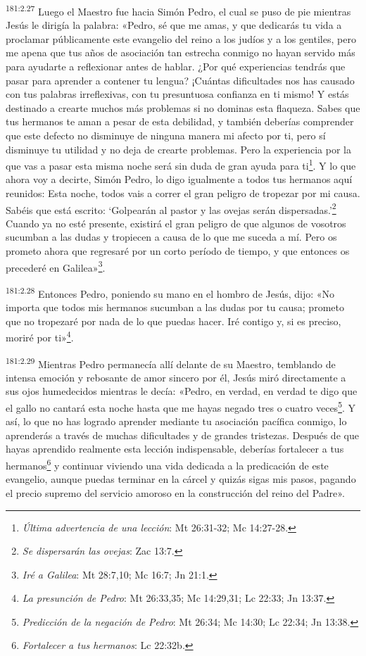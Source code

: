 \par 
\textsuperscript{181:2.27} Luego el Maestro fue hacia Simón Pedro, el cual se puso de pie mientras Jesús le dirigía la palabra: «Pedro, sé que me amas, y que dedicarás tu vida a proclamar públicamente este evangelio del reino a los judíos y a los gentiles, pero me apena que tus años de asociación tan estrecha conmigo no hayan servido más para ayudarte a reflexionar antes de hablar. ¿Por qué experiencias tendrás que pasar para aprender a contener tu lengua? ¡Cuántas dificultades nos has causado con tus palabras irreflexivas, con tu presuntuosa confianza en ti mismo! Y estás destinado a crearte muchos más problemas si no dominas esta flaqueza. Sabes que tus hermanos te aman a pesar de esta debilidad, y también deberías comprender que este defecto no disminuye de ninguna manera mi afecto por ti, pero sí disminuye tu utilidad y no deja de crearte problemas. Pero la experiencia por la que vas a pasar esta misma noche será sin duda de gran ayuda para ti\footnote{\textit{Última advertencia de una lección}: Mt 26:31-32; Mc 14:27-28.}. Y lo que ahora voy a decirte, Simón Pedro, lo digo igualmente a todos tus hermanos aquí reunidos: Esta noche, todos vais a correr el gran peligro de tropezar por mi causa. Sabéis que está escrito: `Golpearán al pastor y las ovejas serán dispersadas.'\footnote{\textit{Se dispersarán las ovejas}: Zac 13:7.} Cuando ya no esté presente, existirá el gran peligro de que algunos de vosotros sucumban a las dudas y tropiecen a causa de lo que me suceda a mí. Pero os prometo ahora que regresaré por un corto período de tiempo, y que entonces os precederé en Galilea»\footnote{\textit{Iré a Galilea}: Mt 28:7,10; Mc 16:7; Jn 21:1.}.

\par 
\textsuperscript{181:2.28} Entonces Pedro, poniendo su mano en el hombro de Jesús, dijo: «No importa que todos mis hermanos sucumban a las dudas por tu causa; prometo que no tropezaré por nada de lo que puedas hacer. Iré contigo y, si es preciso, moriré por ti»\footnote{\textit{La presunción de Pedro}: Mt 26:33,35; Mc 14:29,31; Lc 22:33; Jn 13:37.}.

\par 
\textsuperscript{181:2.29} Mientras Pedro permanecía allí delante de su Maestro, temblando de intensa emoción y rebosante de amor sincero por él, Jesús miró directamente a sus ojos humedecidos mientras le decía: «Pedro, en verdad, en verdad te digo que el gallo no cantará esta noche hasta que me hayas negado tres o cuatro veces\footnote{\textit{Predicción de la negación de Pedro}: Mt 26:34; Mc 14:30; Lc 22:34; Jn 13:38.}. Y así, lo que no has logrado aprender mediante tu asociación pacífica conmigo, lo aprenderás a través de muchas dificultades y de grandes tristezas. Después de que hayas aprendido realmente esta lección indispensable, deberías fortalecer a tus hermanos\footnote{\textit{Fortalecer a tus hermanos}: Lc 22:32b.} y continuar viviendo una vida dedicada a la predicación de este evangelio, aunque puedas terminar en la cárcel y quizás sigas mis pasos, pagando el precio supremo del servicio amoroso en la construcción del reino del Padre».

